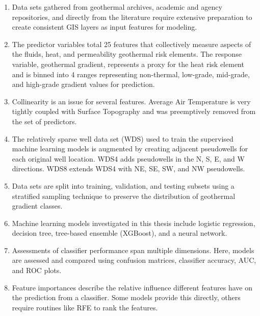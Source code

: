 \begin{enumerate}
    \item Data sets gathered from geothermal archives, academic and agency repositories, and directly from the literature require extensive preparation to create consistent GIS layers as input features for modeling.
    \item The predictor variables total 25 features that collectively measure aspects of the fluids, heat, and permeability geothermal risk elements.  The response variable, geothermal gradient, represents a proxy for the heat risk element and is binned into 4 ranges representing non-thermal, low-grade, mid-grade, and high-grade gradient values for prediction.
    \item Collinearity is an issue for several features. Average Air Temperature is very tightly coupled with Surface Topography and was preemptively removed from the set of predictors.
    \item The relatively sparse well data set (WDS) used to train the supervised machine learning models is augmented by creating adjacent pseudowells for each original well location. WDS4 adds pseudowells in the N, S, E, and W directions. WDS8 extends WDS4 with NE, SE, SW, and NW pseudowells.
    \item Data sets are split into training, validation, and testing subsets using a stratified sampling technique to preserve the distribution of geothermal gradient classes.
    \item Machine learning models investigated in this thesis include logistic regression, decision tree, tree-based ensemble (XGBoost), and a neural network.
    \item Assessments of classifier performance span multiple dimensions. Here, models are assessed and compared using confusion matrices, classifier accuracy, AUC, and ROC plots.
    \item Feature importances describe the relative influence different features have on the prediction from a classifier. Some models provide this directly, others require routines like RFE to rank the features.

\end{enumerate}
